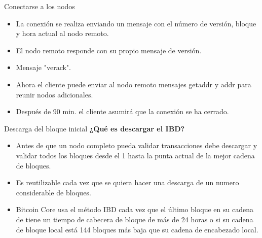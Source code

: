 \documentclass[compress,brown,xcolor=table]{beamer}
\begin{document}
\begin{frame}{Conectarse a los nodos}
\begin{itemize}
	\item La conexión se realiza enviando un mensaje con el número de versión, bloque y hora actual al nodo remoto.\\

	\item El nodo remoto responde con su propio mensaje de versión.\\

	\item Mensaje "verack".\\

	\item Ahora el cliente puede enviar al nodo remoto mensajes getaddr y addr para reunir nodos adicionales.\\
	
	\item Después de 90 min. el cliente asumirá que la conexión se ha cerrado.\\
\end{itemize}
\end{frame}

\begin{frame}{Descarga del bloque inicial}
\textbf{¿Qué es descargar el IBD?}\\
\begin{itemize}
	\item Antes de que un nodo completo pueda validar transacciones debe descargar y validar todos los bloques desde el 1 hasta la punta actual de la mejor cadena de bloques.\\

	\item Es reutilizable cada vez que se quiera hacer una descarga de un numero considerable de bloques.\\

	\item Bitcoin Core usa el método IBD cada vez que el último bloque en su cadena de tiene un tiempo de cabecera de bloque de más de 24 horas o si su cadena de bloque local está 144 bloques más baja que su cadena de encabezado local.\\
\end{itemize}
\end{frame}
\end{document}
